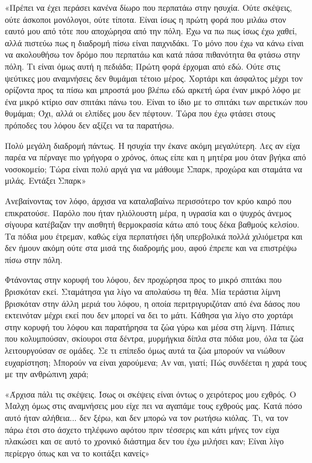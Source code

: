 \documentclass[12pt,twoside, openany]{book}
\begin{document}
«Πρέπει να έχει περάσει κανένα δίωρο που περπατάω στην ησυχία. Ούτε σκέψεις, ούτε άσκοποι μονόλογοι, ούτε τίποτα. Είναι ίσως η πρώτη φορά που μιλάω στον εαυτό μου από τότε που αποχώρησα από την πόλη. Έχω να πω πως ίσως έχω χαθεί, αλλά πιστεύω πως η διαδρομή πίσω είναι παιχνιδάκι. Το μόνο που έχω να κάνω είναι να ακολουθήσω τον δρόμο που περπατάω και κατά πάσα πιθανότητα θα φτάσω στην πόλη. Τι είναι όμως αυτή η πεδιάδα; Πρώτη φορά έρχομαι από εδώ. Ούτε στις ψεύτικες μου αναμνήσεις δεν θυμάμαι τέτοιο μέρος. Χορτάρι και άσφαλτος μέχρι τον ορίζοντα προς τα πίσω και μπροστά μου βλέπω εδώ αρκετή ώρα έναν μικρό λόφο με ένα μικρό κτίριο σαν σπιτάκι πάνω του. Είναι το ίδιο με το σπιτάκι των αιρετικών που θυμάμαι; Όχι, αλλά οι ελπίδες μου δεν πέφτουν. Τώρα που έχω φτάσει στους πρόποδες του λόφου δεν αξίζει να τα παρατήσω.

Πολύ μεγάλη διαδρομή πάντως. Η ησυχία την έκανε ακόμη μεγαλύτερη. Λες αν είχα παρέα να πέρναγε πιο γρήγορα ο χρόνος, όπως είπε και η μητέρα μου όταν βγήκα από νοσοκομείο; Τώρα είναι πολύ αργά για να μάθουμε Σπαρκ, προχώρα και σταμάτα να μιλάς. Εντάξει Σπαρκ»

Ανεβαίνοντας τον λόφο, άρχισα να καταλαβαίνω περισσότερο τον κρύο καιρό που επικρατούσε. Παρόλο που ήταν ηλιόλουστη μέρα, η υγρασία και ο ψυχρός άνεμος σίγουρα κατέβαζαν την αισθητή θερμοκρασία κάτω από τους δέκα βαθμούς κελσίου. Τα πόδια μου έτρεμαν, καθώς είχα περπατήσει ήδη υπερβολικά πολλά χιλιόμετρα και δεν ήμουν ακόμη ούτε στα μισά της διαδρομής μου, αφού έπρεπε και να επιστρέψω πίσω στην πόλη.

Φτάνοντας στην κορυφή του λόφου, δεν προχώρησα προς το μικρό σπιτάκι που βρισκόταν εκεί. Σταμάτησα για λίγο να απολαύσω τη θέα. Μία τεράστια λίμνη βρισκόταν στην άλλη μεριά του λόφου, η οποία περιτριγυριζόταν από ένα δάσος που εκτεινόταν μέχρι εκεί που δεν μπορεί να δει το μάτι. Κάθησα για λίγο στο χορτάρι στην κορυφή του λόφου και παρατήρησα τα ζώα γύρω και μέσα στη λίμνη. Πάπιες που κολυμπούσαν, σκίουροι στα δέντρα, μυρμήγκια δίπλα στα πόδια μου, όλα τα ζώα λειτουργούσαν σε ομάδες. Σε τι επίπεδο όμως αυτά τα ζώα μπορούν να νιώθουν ευχαρίστηση; Μπορούν να είναι χαρούμενα; Αν ναι, γιατί; Πώς συνδέεται η χαρά τους με την ανθρώπινη χαρά;

«Άρχισα πάλι τις σκέψεις. Ίσως οι σκέψεις είναι όντως ο χειρότερος μου εχθρός. Ο Μαλχη όμως στις αναμνήσεις μου είχε πει να αγαπάμε τους εχθρούς μας. Κατά πόσο αυτό ήταν αλήθεια... δεν ξέρω, και δεν μπορώ να τον ρωτήσω κιόλας. Τι, να τον πάρω έτσι στο άσχετο τηλέφωνο αφότου πριν τέσσερις και κάτι μήνες τον είχα πλακώσει και σε αυτό το χρονικό διάστημα δεν του έχω μιλήσει καν; Είναι λίγο περίεργο όπως και να το κοιτάξει κανείς»
\end{document}
